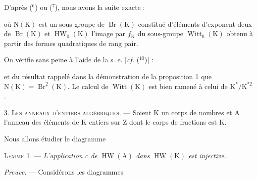 D'après (${}^6$) ou (${}^7$), nous avons la suite exacte :


où $\mathrm N(\mathrm K)$ est un sous-groupe de $\operatorname{Br}(\mathrm K)$ constitué d'éléments d'exponent deux de $\operatorname{Br}(\mathrm K)$
et $\operatorname{HW}_0(\mathrm K)$ l'image par $f_{\mathrm K}$ du sous-groupe $\operatorname{Witt}_0(\mathrm K)$ obtenu à partir des formes quadratiques
de rang pair.

On vérifie sans peine à l'aide de la s. e. [\emph{cf.} (${}^{10}$)] :


et du résultat rappelé dans la démonstration de la proposition 1 que $\mathrm N(\mathrm K)=\operatorname{Br}^2(\mathrm K)$.
Le calcul de $\operatorname{Witt}(\mathrm K)$ est bien ramené à celui de $\mathrm K^*/\mathrm K^{*2}$.

3. \textsc{Les anneaux d'entiers algébriques}. — Soient K un corps de nombres et A l'anneau
des éléments de K entiers sur Z dont le corps de fractions est K.

Nous allons étudier le diagramme


\textsc{Lemme 1}. — \emph{L'application $c$ de $\operatorname{HW}(\mathrm A)$ dans $\operatorname{HW}(\mathrm K)$ est injective.}

\emph{Preuve}. — Considérons les diagrammes


